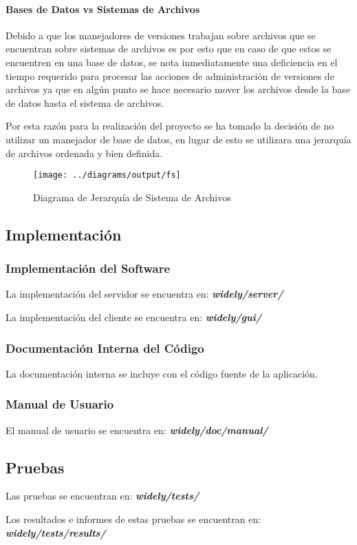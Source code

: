 \paragraph{Bases de Datos vs Sistemas de Archivos}

Debido a que los manejadores de versiones trabajan sobre archivos que se encuentran sobre sistemas de archivos es por esto que en caso de que estos se encuentren en una base de datos, se nota inmediatamente una deficiencia en el tiempo requerido para procesar las acciones de administración de versiones de archivos ya que en algún punto se hace necesario mover los archivos desde la base de datos hasta el sistema de archivos.

Por esta razón para la realización del proyecto se ha tomado la decisión de no utilizar un manejador de base de datos, en lugar de esto se utilizara una jerarquía de archivos ordenada y bien definida.


\begin{figure}
 \centering
 \texttt{[image: ../diagrams/output/fs]}
 \caption{Diagrama de Jerarquía de Sistema de Archivos}
 \label{diagrama:fs}
\end{figure}


\newpage

\subsection{Implementación}


\subsubsection{Implementación del Software}

La implementación del servidor se encuentra en: \textit{\textbf{widely/server/}}

La implementación del cliente se encuentra en: \textit{\textbf{widely/gui/}}


\subsubsection{Documentación Interna del Código}

La documentación interna se incluye con el código fuente de la aplicación.


\subsubsection{Manual de Usuario}

El manual de usuario se encuentra en: \textit{\textbf{widely/doc/manual/}}


\subsection{Pruebas}

Las pruebas se encuentran en: \textit{\textbf{widely/tests/}}

Los resultados e informes de estas pruebas se encuentran en: \textit{\textbf{widely/tests/results/}}

